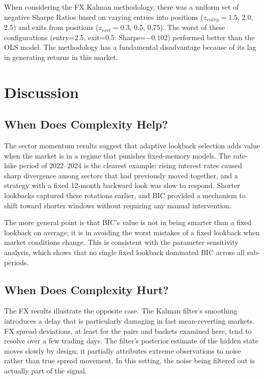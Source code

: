 \documentclass[12pt]{article}
\begin{document}
When considering the FX Kalman methodology, there was a uniform set of negative Sharpe Ratios based on varying entries into positions ($z_{entry} = 1.5$, 2.0, 2.5) and exits from positions ($z_{exit} = 0.3$, 0.5, 0.75). The worst of these configurations (entry=2.5, exit=0.5: Sharpe=$-0.102$) performed better than the OLS model. The methodology has a fundamental disadvantage because of its lag in generating returns in this market.

\section{Discussion}

\subsection{When Does Complexity Help?}

The sector momentum results suggest that adaptive lookback selection adds value when the market is in a regime that punishes fixed-memory models. The rate-hike period of 2022--2024 is the clearest example: rising interest rates caused sharp divergence among sectors that had previously moved together, and a strategy with a fixed 12-month backward look was slow to respond. Shorter lookbacks captured these rotations earlier, and BIC provided a mechanism to shift toward shorter windows without requiring any manual intervention.

The more general point is that BIC's value is not in being smarter than a fixed lookback on average; it is in avoiding the worst mistakes of a fixed lookback when market conditions change. This is consistent with the parameter sensitivity analysis, which shows that no single fixed lookback dominated BIC across all sub-periods.

\subsection{When Does Complexity Hurt?}

The FX results illustrate the opposite case. The Kalman filter's smoothing introduces a delay that is particularly damaging in fast mean-reverting markets. FX spread deviations, at least for the pairs and baskets examined here, tend to resolve over a few trading days. The filter's posterior estimate of the hidden state moves slowly by design; it partially attributes extreme observations to noise rather than true spread movement. In this setting, the noise being filtered out is actually part of the signal.
\end{document}
